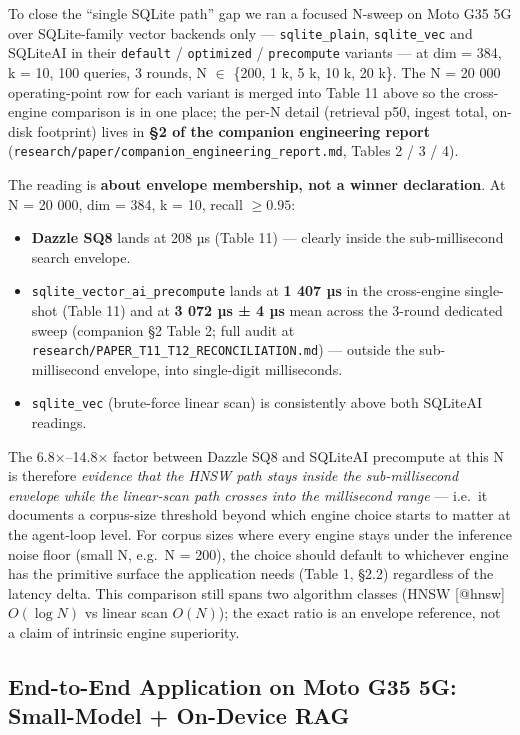 To close the ``single SQLite path'' gap we ran a focused N-sweep on Moto G35 5G
over SQLite-family vector backends only --- \texttt{sqlite\_plain},
\texttt{sqlite\_vec} and SQLiteAI in their \texttt{default} / \texttt{optimized}
/ \texttt{precompute} variants --- at dim = 384, k = 10, 100 queries, 3 rounds,
N \(\in\) \{200, 1 k, 5 k, 10 k, 20 k\}. The N = 20 000 operating-point row for
each variant is merged into Table 11 above so the cross-engine comparison is in
one place; the per-N detail (retrieval p50, ingest total, on-disk footprint)
lives in \textbf{§2 of the companion engineering report}
(\texttt{research/paper/companion\_engineering\_report.md}, Tables 2 / 3 / 4).

The reading is \textbf{about envelope membership, not a winner declaration}. At
N = 20 000, dim = 384, k = 10, recall \(\geq 0.95\):

\begin{itemize}
\tightlist
\item
  \textbf{Dazzle SQ8} lands at 208 µs (Table 11) --- clearly inside the
  sub-millisecond search envelope.
\item
  \texttt{sqlite\_vector\_ai\_precompute} lands at \textbf{1 407 µs} in the
  cross-engine single-shot (Table 11) and at \textbf{3 072 µs ± 4 µs} mean
  across the 3-round dedicated sweep (companion §2 Table 2; full audit at
  \texttt{research/PAPER\_T11\_T12\_RECONCILIATION.md}) --- outside the
  sub-millisecond envelope, into single-digit milliseconds.
\item
  \texttt{sqlite\_vec} (brute-force linear scan) is consistently above both
  SQLiteAI readings.
\end{itemize}

The 6.8×--14.8× factor between Dazzle SQ8 and SQLiteAI precompute at this N is
therefore \emph{evidence that the HNSW path stays inside the sub-millisecond
envelope while the linear-scan path crosses into the millisecond range} ---
i.e.~it documents a corpus-size threshold beyond which engine choice starts to
matter at the agent-loop level. For corpus sizes where every engine stays under
the inference noise floor (small N, e.g.~N = 200), the choice should default to
whichever engine has the primitive surface the application needs (Table 1, §2.2)
regardless of the latency delta. This comparison still spans two algorithm
classes (HNSW {[}@hnsw{]} \(O(\log N)\) vs linear scan \(O(N)\)); the exact
ratio is an envelope reference, not a claim of intrinsic engine superiority.

\subsection{End-to-End Application on Moto G35 5G: Small-Model + On-Device
RAG}\label{end-to-end-application-on-moto-g35-5g-small-model-on-device-rag}

